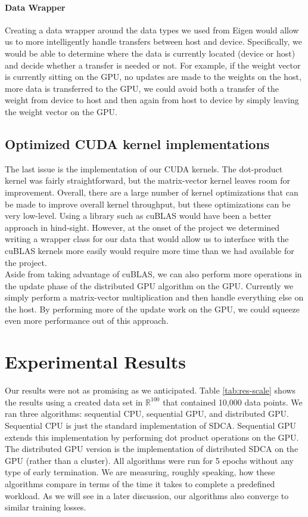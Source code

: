 \documentclass{article}
\def \R {\mathbb{R}}
\def \R {\mathbb{R}}
\begin{document}
\paragraph{Data Wrapper} Creating a data wrapper around the data types we used
from Eigen would allow us to more intelligently handle transfers between host
and device. Specifically, we would be able to determine where the data is
currently located (device or host) and decide whether a transfer is needed or
not. For example, if the weight vector is currently sitting on the GPU, no
updates are made to the weights on the host, more data is transferred to the
GPU, we could avoid both a transfer of the weight from device to host and then
again from host to device by simply leaving the weight vector on the GPU.

\subsection{Optimized CUDA kernel implementations}
The last issue is the implementation of our CUDA kernels. The dot-product
kernel was fairly straightforward, but the matrix-vector kernel leaves room for
improvement. Overall, there are a large number of kernel optimizations that can
be made to improve overall kernel throughput, but these optimizations can be
very low-level. Using a library such as cuBLAS would have been a better
approach in hind-sight. However, at the onset of the project we determined
writing a wrapper class for our data that would allow us to interface with the
cuBLAS kernels more easily would require more time than we had available for
the project.\\

Aside from taking advantage of cuBLAS, we can also perform more operations in
the update phase of the distributed GPU algorithm on the GPU. Currently we
simply perform a matrix-vector multiplication and then handle everything else on
the host. By performing more of the update work on the GPU, we could squeeze
even more performance out of this approach.

\section{Experimental Results}
Our results were not as promising as we anticipated. Table \ref{tab:res-scale}
shows the results using a created data set in $\R^{100}$ that contained 10,000
data points. We ran three algorithms: sequential CPU, sequential GPU, and
distributed GPU. Sequential CPU is just the standard implementation of SDCA.
Sequential GPU extends this implementation by performing dot product operations
on the GPU. The distributed GPU version is the implementation of distributed
SDCA on the GPU (rather than a cluster). All algorithms were run for 5 epochs
without any type of early termination. We are measuring, roughly speaking, how
these algorithms compare in terms of the time it takes to complete a predefined
workload. As we will see in a later discussion, our algorithms also converge to
similar training losses.
\end{document}
